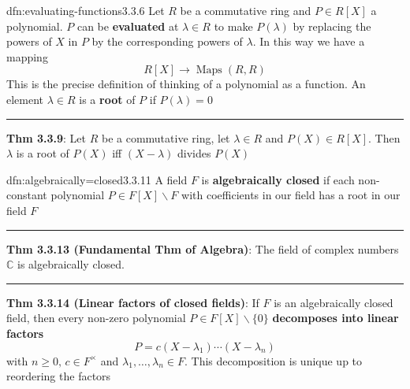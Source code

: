 \documentclass[landscape, 8pt]{extarticle}
\DeclareMathOperator{\Maps}{Maps}
\begin{document}
\begin{multicols}{3}
\begin{dfn}{dfn:evaluating-functions}{3.3.6}
    \vspace{-5pt}
    Let $R$ be a commutative ring and $P\in R[X]$ a polynomial. $P$ can be \textbf{evaluated} at $\lambda\in R$ to make $P(\lambda)$ by replacing the powers of $X$ in $P$ by the corresponding powers of $\lambda$. In this way we have a mapping
    \[R[X] \to \Maps(R, R)\]
    This is the precise definition of thinking of a polynomial as a function. An element $\lambda\in R$ is a \textbf{root} of $P$ if $P(\lambda) = 0$

    \noindent\rule{\textwidth}{0.2pt}
    \textbf{Thm 3.3.9}: Let $R$ be a commutative ring, let $\lambda\in R$ and $P(X)\in R[X]$. Then $\lambda$ is a root of $P(X)$ iff $(X - \lambda)$ divides $P(X)$
\end{dfn}

\vspace{-5pt}
\begin{dfn}{dfn:algebraically=closed}{3.3.11}
    \vspace{-5pt}
    A field $F$ is \textbf{algebraically closed} if each non-constant polynomial $P\in F[X]\backslash F$ with coefficients in our field has a root in our field $F$

    \noindent\rule{\textwidth}{0.2pt}

    \textbf{Thm 3.3.13 (Fundamental Thm of Algebra)}: The field of complex numbers $\mathbb{C}$ is algebraically closed.

    \noindent\rule{\textwidth}{0.2pt}
    \textbf{Thm 3.3.14 (Linear factors of closed fields)}: If $F$ is an algebraically closed field, then every non-zero polynomial $P\in F[X]\backslash \{0\}$ \textbf{decomposes into linear factors}
    \[P = c(X - \lambda_{1}) \cdots (X - \lambda_{n})\]
    with $n\ge 0,\, c\in F^{\times}$ and $\lambda_{1},\dots,\lambda_{n}\in F$. This decomposition is unique up to reordering the factors
\end{dfn}

\vspace{-5pt}





\end{multicols}
\end{document}
